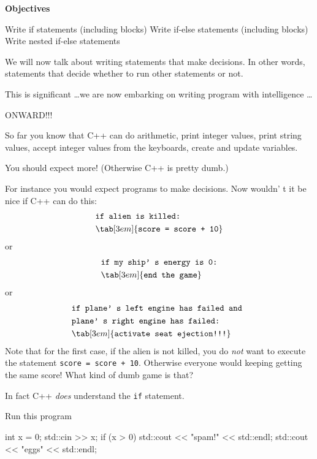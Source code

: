 
\textbf{Objectives}
\begin{tightlist}
\li
  Write if statements (including blocks)
\li
  Write if-else statements (including blocks)
\li
  Write nested if-else statements
\end{tightlist}

We will now talk about writing statements that make decisions. In other
words, statements that decide whether to run other statements or not.

This is significant \dots we are now embarking on writing program
with intelligence \dots

ONWARD!!!

\newpage{}

So far you know that C++ can do arithmetic, print integer values, print
string values, accept integer values from the keyboards, create and
update variables.

You should expect more! (Otherwise C++ is pretty dumb.)

For instance you would expect programs to make decisions. Now
wouldn' t it be nice if C++ can do this:
\begin{align*}
&\texttt{if alien is killed:}\\
& \tab[3em]{\texttt{score = score + 10}}\\
\end{align*}
or
\begin{align*}
&\texttt{if my ship' s energy is 0:}\\
& \tab[3em]{\texttt{end the game}}\\
\end{align*}
or
\begin{align*}
&\texttt{if plane' s left engine has failed and }\\
&\texttt{plane' s right engine has failed:}\\
& \tab[3em]{\texttt{activate seat ejection!!!}}\\
\end{align*}
Note that for the first case, if the alien is not killed, you do
\textit{not} want to execute the statement \verb!score = score + 10!.
Otherwise everyone would keeping getting the same score! What kind of
dumb game is that?

In fact C++ \textit{does} understand the \verb!if! statement.

Run this program\\
\begin{console}
int x = 0;
std::cin >> x;
if (x > 0)
       std::cout << "spam!" << std::endl;
std::cout << "eggs" << std::endl;
\end{console}

